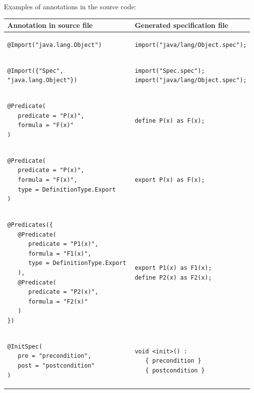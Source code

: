 \documentclass{article}
\begin{document}
Examples of annotations in the source code:\\
\begin{longtable}{ m{7cm} | m{5cm} }
Annotation in source file & Generated specification file \\
\hline
\begin{verbatim}
@Import("java.lang.Object")
\end{verbatim}
& 
\begin{verbatim}
import("java/lang/Object.spec");
\end{verbatim}
\\
\begin{verbatim}
@Import({"Spec", "java.lang.Object"})
\end{verbatim}
& 
\begin{verbatim}
import("Spec.spec");
import("java/lang/Object.spec");
\end{verbatim}
\\
\begin{verbatim}
@Predicate(
   predicate = "P(x)", 
   formula = "F(x)"
)
\end{verbatim} 
&
\begin{verbatim}
define P(x) as F(x);
\end{verbatim}
\\
\begin{verbatim}
@Predicate(
   predicate = "P(x)", 
   formula = "F(x)", 
   type = DefinitionType.Export
)
\end{verbatim}  
&
\begin{verbatim}
export P(x) as F(x);
\end{verbatim}\\
\begin{verbatim}
@Predicates({
   @Predicate(
      predicate = "P1(x)", 
      formula = "F1(x)", 
      type = DefinitionType.Export
   ),
   @Predicate(
      predicate = "P2(x)", 
      formula = "F2(x)"
   )
})
\end{verbatim} 
& 
\begin{verbatim}
export P1(x) as F1(x);
define P2(x) as F2(x);
\end{verbatim}
\\
\begin{verbatim}
@InitSpec(
   pre = "precondition", 
   post = "postcondition"
)
\end{verbatim}
&
\begin{verbatim}
void <init>() :
   { precondition }
   { postcondition }
\end{verbatim}
\\

\end{longtable}
\end{document}
